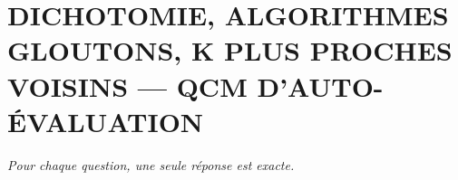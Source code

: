 
\section*{\textcolor{chapcolor}{\MakeUppercase{Dichotomie, algorithmes gloutons, k plus proches voisins — QCM d'auto-évaluation}}}

\begin{center}
\textit{Pour chaque question, une seule réponse est exacte.}
\end{center}

